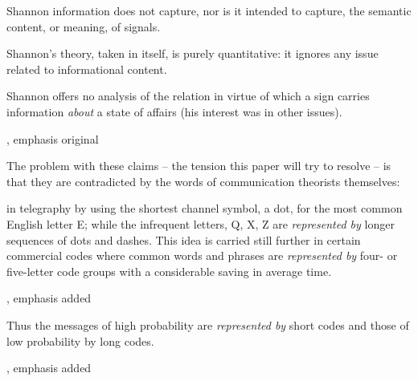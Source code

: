 \documentclass[12pt]{article}
\begin{document}
\begin{myquote}
Shannon information does not capture, nor is it intended to capture, the semantic content, or meaning, of signals.
\par\hspace*{\fill}\citet[21]{piccinini2011information}
\end{myquote}

\begin{myquote}
Shannon’s theory, taken in itself, is purely quantitative: it ignores any issue related to informational content.
\par\hspace*{\fill}\citet[1989]{lombardi2015shannon}
\end{myquote}

\begin{myquote}
Shannon offers no analysis of the relation in virtue of which a sign carries information \textit{about} a state of affairs (his interest was in other issues).
\par\hspace*{\fill}\citet[7]{neander2017mark}, emphasis original
\end{myquote}

\noindent The problem with these claims -- the tension this paper will try to resolve -- is that they are contradicted by the words of communication theorists themselves:

\begin{myquote}
 in telegraphy by using the shortest channel symbol, a dot, for the most common English letter E; while the infrequent letters, Q, X, Z are \textit{represented by} longer sequences of dots and dashes. This idea is carried still further in certain commercial codes where common words and phrases are \textit{represented by} four- or five-letter code groups with a considerable saving in average time.
\par\hspace*{\fill}\citet[385]{shannon1948mathematicalc}, emphasis added
\end{myquote}

\begin{myquote}
Thus the messages of high probability are \textit{represented by} short codes and those of low probability by long codes.
\par\hspace*{\fill}\citet[402]{shannon1948mathematicalc}, emphasis added
\end{myquote}
\end{document}
